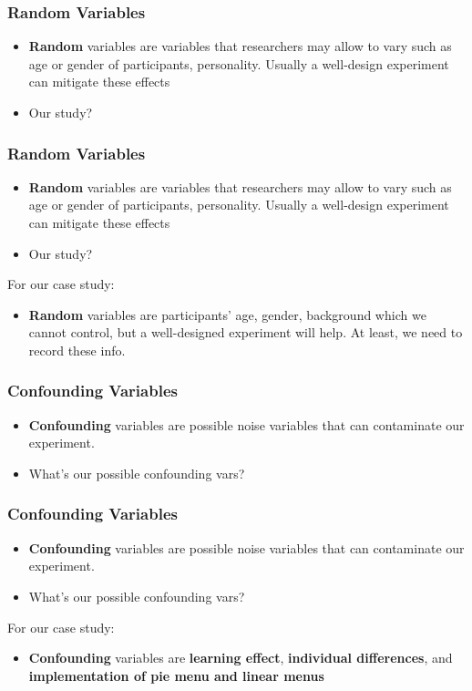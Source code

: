 \documentclass{beamer}
\begin{document}
\begin{frame}
	\frametitle{Random Variables}
	\begin{itemize}
		\item \textbf{Random} variables are variables that researchers may allow to vary such as age or gender of participants, personality.  Usually a well-design experiment can mitigate these effects
		\item Our study?
	\end{itemize}
\end{frame}

\begin{frame}
	\frametitle{Random Variables}
	\begin{itemize}
		\item \textbf{Random} variables are variables that researchers may allow to vary such as age or gender of participants, personality.  Usually a well-design experiment can mitigate these effects
		\item Our study?
	\end{itemize}
	For our case study:
	\begin{itemize}
		\item \textbf{Random} variables are participants' age, gender, background which we cannot control, but a well-designed experiment will help.  At least, we need to record these info.
	\end{itemize}
\end{frame}

\begin{frame}
	\frametitle{Confounding Variables}
	\begin{itemize}
		\item \textbf{Confounding} variables are possible noise variables that can contaminate our experiment.
		\item What's our possible confounding vars?
	\end{itemize}
\end{frame}

\begin{frame}
	\frametitle{Confounding Variables}
	\begin{itemize}
		\item \textbf{Confounding} variables are possible noise variables that can contaminate our experiment.
		\item What's our possible confounding vars?
	\end{itemize}
	For our case study:
	\begin{itemize}
		\item \textbf{Confounding} variables are \textbf{learning effect},  \textbf{individual differences}, and \textbf{implementation of pie menu and linear menus}
	\end{itemize}
\end{frame}
\end{document}
